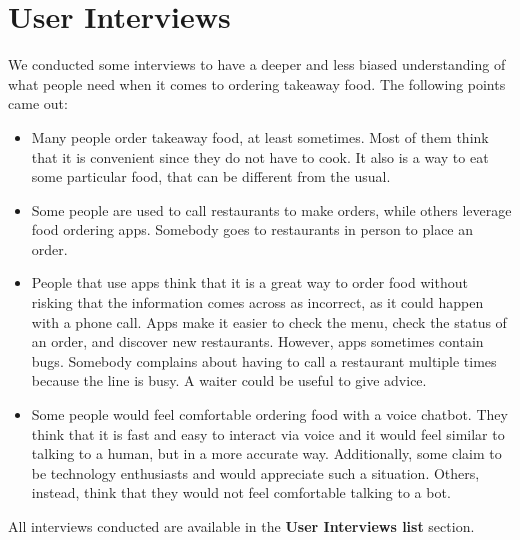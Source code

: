 \section{User Interviews}

We conducted some interviews to have a deeper and less biased understanding of
what people need when it comes to ordering takeaway food. The following
points came out:

\begin{itemize}
    \item Many people order takeaway food, at least sometimes. Most of them think
    that it is convenient since they do not have to cook. It also is a way to
    eat some particular food, that can be different from the usual.
    \item Some people are used to call restaurants to make orders, while others
    leverage food ordering apps. Somebody goes to restaurants in person to place
    an order.
    \item People that use apps think that it is a great way to order food without
    risking that the information comes across as incorrect, as it could happen
    with a phone call. Apps make it easier to check the menu, check the status
    of an order, and discover new restaurants. However, apps sometimes contain
    bugs. Somebody complains about having to call a restaurant multiple
    times because the line is busy. A waiter could be useful to give advice.
    \item Some people would feel comfortable ordering food with a voice chatbot.
    They think that it is fast and easy to interact via voice and it would feel
    similar to talking to a human, but in a more accurate way. Additionally, some
    claim to be technology enthusiasts and would appreciate such a situation.
    Others, instead,
    think that they would not feel comfortable talking to a bot.

\end{itemize}

All interviews conducted are available in the \textbf{User Interviews list} section.
